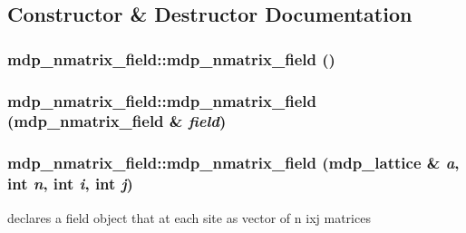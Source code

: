 \subsection{Constructor \& Destructor Documentation}
\hypertarget{classmdp__nmatrix__field_a2431fcb07b72317d2bf87e46ddad80b1}{
\subsubsection[{mdp\_\-nmatrix\_\-field}]{\setlength{\rightskip}{0pt plus 5cm}mdp\_\-nmatrix\_\-field::mdp\_\-nmatrix\_\-field ()}}
\label{classmdp__nmatrix__field_a2431fcb07b72317d2bf87e46ddad80b1}
\hypertarget{classmdp__nmatrix__field_a8a3db6bfa6ffc2a5679c24f3e297e0c4}{
\subsubsection[{mdp\_\-nmatrix\_\-field}]{\setlength{\rightskip}{0pt plus 5cm}mdp\_\-nmatrix\_\-field::mdp\_\-nmatrix\_\-field ({\bf mdp\_\-nmatrix\_\-field} \& {\em field})}}
\label{classmdp__nmatrix__field_a8a3db6bfa6ffc2a5679c24f3e297e0c4}
\hypertarget{classmdp__nmatrix__field_a10d00272d103d471a1cd9e5921d39419}{
\subsubsection[{mdp\_\-nmatrix\_\-field}]{\setlength{\rightskip}{0pt plus 5cm}mdp\_\-nmatrix\_\-field::mdp\_\-nmatrix\_\-field ({\bf mdp\_\-lattice} \& {\em a}, \/  int {\em n}, \/  int {\em i}, \/  int {\em j})}}
\label{classmdp__nmatrix__field_a10d00272d103d471a1cd9e5921d39419}


declares a field object that at each site as vector of n ixj matrices 

